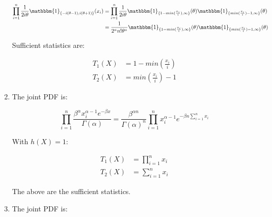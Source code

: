 \documentclass[11pt,letterpaper,titlepage]{article}
\begin{document}
\begin{enumerate}
    \begin{equation*}
        \begin{aligned}
            \prod_{i = 1}^{n} \frac{1}{2i\theta} \mathbbm{1}_{\{-i(\theta-1), i(\theta+1)\}}(x_i) &= \prod_{i = 1}^{n} \frac{1}{2i\theta} \mathbbm{1}_{\{1-min(\frac{x_i}{i}), \infty\}}(\theta) \mathbbm{1}_{\{min(\frac{x_i}{i})-1, \infty\}}(\theta) \\
            &= \frac{1}{2^n n! \theta^n} \mathbbm{1}_{\{1-min(\frac{x_i}{i}), \infty\}}(\theta) \mathbbm{1}_{\{min(\frac{x_i}{i})-1, \infty\}}(\theta)
        \end{aligned}
    \end{equation*}
    
    Sufficient statistics are:
    
    \begin{equation*}
        \begin{aligned}
            T_1(X) &= 1 - min(\frac{x_i}{i}) \\
            T_2(X) &= min(\frac{x_i}{i}) - 1
        \end{aligned}
    \end{equation*}
    
    \item %
    
    The joint PDF is:
    
    \begin{equation*}
        \prod_{i=1}^{n} \frac{\beta^{\alpha} x_i^{\alpha-1} e^{-\beta x}}{\Gamma(\alpha)} = \frac{\beta^{\alpha n}}{\Gamma(\alpha)^n} \prod_{i=1}^{n} x_i^{\alpha-1} e^{-\beta n \sum_{i=1}^{n} x_i}
    \end{equation*}
    
    With $h(X) = 1$:
    
    \begin{equation*}
        \begin{aligned}
            T_1(X) &= \prod_{i=1}^{n} x_i \\
            T_2(X) &= \sum_{i=1}^{n} x_i
        \end{aligned}
    \end{equation*}
    
    The above are the sufficient statistics.
    
    \item %
    
    The joint PDF is:
    

\end{enumerate}
\end{document}
